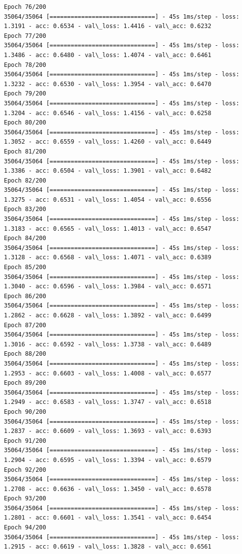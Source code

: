 \documentclass[11pt]{article}
\begin{document}
\begin{Verbatim}[commandchars=\\\{\}]
Epoch 76/200
35064/35064 [==============================] - 45s 1ms/step - loss: 1.3191 - acc: 0.6534 - val\_loss: 1.4416 - val\_acc: 0.6232
Epoch 77/200
35064/35064 [==============================] - 45s 1ms/step - loss: 1.3486 - acc: 0.6480 - val\_loss: 1.4074 - val\_acc: 0.6461
Epoch 78/200
35064/35064 [==============================] - 45s 1ms/step - loss: 1.3232 - acc: 0.6530 - val\_loss: 1.3954 - val\_acc: 0.6470
Epoch 79/200
35064/35064 [==============================] - 45s 1ms/step - loss: 1.3204 - acc: 0.6546 - val\_loss: 1.4156 - val\_acc: 0.6258
Epoch 80/200
35064/35064 [==============================] - 45s 1ms/step - loss: 1.3052 - acc: 0.6559 - val\_loss: 1.4260 - val\_acc: 0.6449
Epoch 81/200
35064/35064 [==============================] - 45s 1ms/step - loss: 1.3386 - acc: 0.6504 - val\_loss: 1.3901 - val\_acc: 0.6482
Epoch 82/200
35064/35064 [==============================] - 45s 1ms/step - loss: 1.3275 - acc: 0.6531 - val\_loss: 1.4054 - val\_acc: 0.6556
Epoch 83/200
35064/35064 [==============================] - 45s 1ms/step - loss: 1.3183 - acc: 0.6565 - val\_loss: 1.4013 - val\_acc: 0.6547
Epoch 84/200
35064/35064 [==============================] - 45s 1ms/step - loss: 1.3128 - acc: 0.6568 - val\_loss: 1.4071 - val\_acc: 0.6389
Epoch 85/200
35064/35064 [==============================] - 45s 1ms/step - loss: 1.3040 - acc: 0.6596 - val\_loss: 1.3984 - val\_acc: 0.6571
Epoch 86/200
35064/35064 [==============================] - 45s 1ms/step - loss: 1.2862 - acc: 0.6628 - val\_loss: 1.3892 - val\_acc: 0.6499
Epoch 87/200
35064/35064 [==============================] - 45s 1ms/step - loss: 1.3016 - acc: 0.6592 - val\_loss: 1.3738 - val\_acc: 0.6489
Epoch 88/200
35064/35064 [==============================] - 45s 1ms/step - loss: 1.2953 - acc: 0.6603 - val\_loss: 1.4008 - val\_acc: 0.6577
Epoch 89/200
35064/35064 [==============================] - 45s 1ms/step - loss: 1.2949 - acc: 0.6583 - val\_loss: 1.3747 - val\_acc: 0.6518
Epoch 90/200
35064/35064 [==============================] - 45s 1ms/step - loss: 1.2837 - acc: 0.6609 - val\_loss: 1.3693 - val\_acc: 0.6393
Epoch 91/200
35064/35064 [==============================] - 45s 1ms/step - loss: 1.2904 - acc: 0.6595 - val\_loss: 1.3394 - val\_acc: 0.6579
Epoch 92/200
35064/35064 [==============================] - 45s 1ms/step - loss: 1.2708 - acc: 0.6636 - val\_loss: 1.3450 - val\_acc: 0.6578
Epoch 93/200
35064/35064 [==============================] - 45s 1ms/step - loss: 1.2801 - acc: 0.6601 - val\_loss: 1.3541 - val\_acc: 0.6454
Epoch 94/200
35064/35064 [==============================] - 45s 1ms/step - loss: 1.2915 - acc: 0.6619 - val\_loss: 1.3828 - val\_acc: 0.6561

\end{Verbatim}
\end{document}
